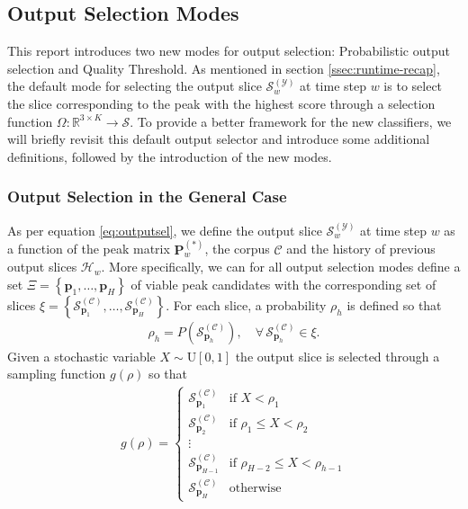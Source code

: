 \subsection{Output Selection Modes}\label{ssec:output-sel}
This report introduces two new modes for output selection: Probabilistic output selection and Quality Threshold. As mentioned in section \ref{ssec:runtime-recap}, the default mode for selecting the output slice $\mathcal S^{(\mathcal Y)}_w$ at time step $w$ is to select the slice corresponding to the peak with the highest score through a selection function $\Omega \colon \mathbb R^{3\times K} \rightarrow \mathcal S$. To provide a better framework for the new classifiers, we will briefly revisit this default output selector and introduce some additional definitions, followed by the introduction of the new modes.

\subsubsection{Output Selection in the General Case}\label{ssec:default-outputsel}
As per equation \ref{eq:outputsel}, we define the output slice $\mathcal S^{(\mathcal Y)}_w$ at time step $w$ as a function of the peak matrix $\bm P^{(\ast)}_w$, the corpus $\mathcal C$ and the history of previous output slices $\mathcal H_w$. More specifically, we can for all output selection modes define a set $\Xi = \left\lbrace \bm p_1, \dots, \bm p_H\right\rbrace$ of viable peak candidates with the corresponding set of slices $\xi =\left\lbrace \mathcal S^{(\mathcal C)}_{\bm p_1}, \dots, \mathcal S^{(\mathcal C)}_{\bm p_H}\right\rbrace$. For each slice, a probability $\rho_h$ is defined so that
	\begin{align}
		\rho_h = P\left(\mathcal S^{(\mathcal C)}_{\bm p_h}\right), \quad \forall\, \mathcal S^{(\mathcal C)}_{\bm p_h} \in \xi.
	\end{align}
	Given a stochastic variable $X \sim \text{U}[0,1]$ the output slice is selected through a sampling function $g(\rho)$ so that
	\begin{align}\label{eq:samplingproba}
		g(\rho) = \left\lbrace\begin{array}{cl}
			\mathcal S^{(\mathcal C)}_{\bm p_1} & \text{if } X < \rho_1\\
			\mathcal S^{(\mathcal C)}_{\bm p_2} & \text{if } \rho_1 \le X < \rho_2\\
			\vdots\\
			\mathcal S^{(\mathcal C)}_{\bm p_{H-1}} & \text{if } \rho_{H-2} \le X < \rho_{h-1}\\
			\mathcal S^{(\mathcal C)}_{\bm p_H} & \text{otherwise}
		\end{array}\right.
	\end{align}
	
